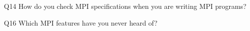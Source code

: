 \begin{description}%
\item{Q14} How do you check MPI specifications when you are writing MPI programs?%
\item{Q16} Which MPI features have you never heard of?%
\end{description}%

